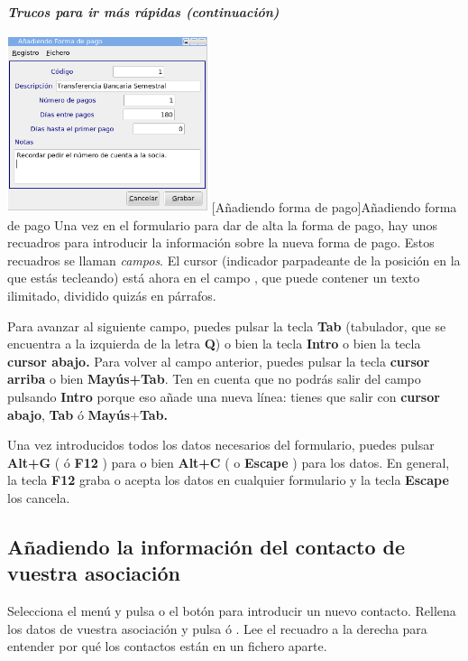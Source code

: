 \begin{center}
\begin{minipage}{16.794cm}
{\centering\bfseries\itshape
Trucos para ir más rápidas (continuación)
\par}

\includegraphics[width=5.877cm,height=5.225cm]{manual-img13.png}
[Añadiendo forma de pago]{Añadiendo forma de pago}
Una vez en el formulario para dar de alta la forma de pago, hay unos
recuadros para introducir la información sobre la nueva forma de
pago. Estos recuadros se llaman \textit{campos}. El cursor (indicador
parpadeante de la posición en la que estás tecleando) está ahora
en el campo , que puede contener un
texto ilimitado, dividido quizás en párrafos.

Para avanzar al siguiente campo, puedes pulsar la tecla \textbf{Tab}
(tabulador, que se encuentra a la izquierda de la letra \textbf{Q}) o
bien la tecla \textbf{Intro} o bien la tecla \textbf{cursor abajo.}
Para volver al campo anterior, puedes pulsar la tecla \textbf{cursor
arriba} o bien \textbf{Mayús+Tab}. Ten en cuenta que no podrás
salir del campo \textit{ }pulsando
\textbf{Intro} porque eso añade una nueva línea: tienes que salir
con \textbf{cursor abajo}, \textbf{Tab} ó
\textbf{Mayús}+\textbf{Tab.}

Una vez introducidos todos los datos necesarios del formulario, puedes
pulsar \textbf{Alt+G }( ó \textbf{F12} )\textbf{ }para
 o bien \textbf{Alt+C} ( o
\textbf{Escape} ) para  los datos.
En general, la tecla \textbf{F12} graba o acepta los datos en cualquier
formulario y la tecla \textbf{Escape} los cancela.
\end{minipage}
\end{center}
\subsection{Añadiendo la información del contacto de vuestra
asociación}
Selecciona el menú  y pulsa  o el botón
 para introducir un nuevo contacto.
Rellena los datos de vuestra asociación y pulsa
 ó . Lee el
recuadro a la derecha para entender por qué los contactos están en
un fichero aparte.

